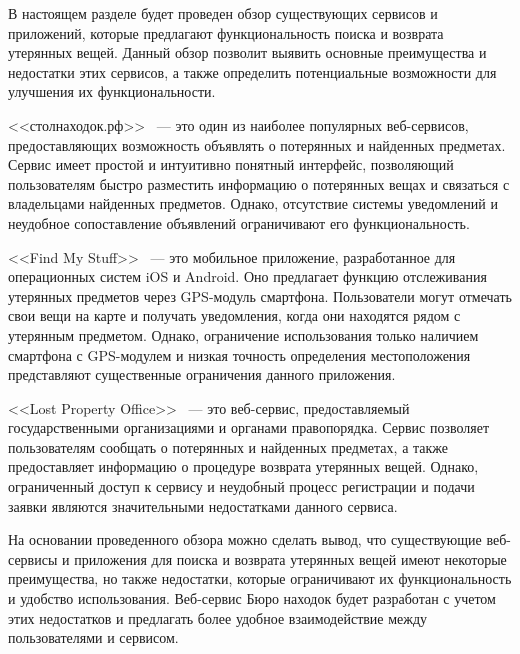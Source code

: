 \documentclass{mirea}
\begin{document}
В настоящем разделе будет проведен обзор существующих сервисов и приложений, которые предлагают функциональность поиска и возврата утерянных вещей. Данный обзор позволит выявить основные преимущества и недостатки этих сервисов, а также определить потенциальные возможности для улучшения их функциональности.

<<столнаходок.рф>>~\cite{bib:stol_nahodok} --- это один из наиболее популярных веб-сервисов, предоставляющих возможность объявлять о потерянных и найденных предметах. Сервис имеет простой и интуитивно понятный интерфейс, позволяющий пользователям быстро разместить информацию о потерянных вещах и связаться с владельцами найденных предметов. Однако, отсутствие системы уведомлений и неудобное сопоставление объявлений ограничивают его функциональность.

<<Find My Stuff>>~\cite{bib:find_my_stuff} --- это мобильное приложение, разработанное для операционных систем iOS и Android. Оно предлагает функцию отслеживания утерянных предметов через GPS-модуль смартфона. Пользователи могут отмечать свои вещи на карте и получать уведомления, когда они находятся рядом с утерянным предметом. Однако, ограничение использования только наличием смартфона с GPS-модулем и низкая точность определения местоположения представляют существенные ограничения данного приложения.

<<Lost Property Office>>~\cite{bib:parliament_lost_and_found} --- это веб-сервис, предоставляемый государственными организациями и органами правопорядка. Сервис позволяет пользователям сообщать о потерянных и найденных предметах, а также предоставляет информацию о процедуре возврата утерянных вещей. Однако, ограниченный доступ к сервису и неудобный процесс регистрации и подачи заявки являются значительными недостатками данного сервиса.

На основании проведенного обзора можно сделать вывод, что существующие веб-сервисы и приложения для поиска и возврата утерянных вещей имеют некоторые преимущества, но также недостатки, которые ограничивают их функциональность и удобство использования. Веб-сервис Бюро находок будет разработан с учетом этих недостатков и предлагать более удобное взаимодействие между пользователями и сервисом.
\end{document}
